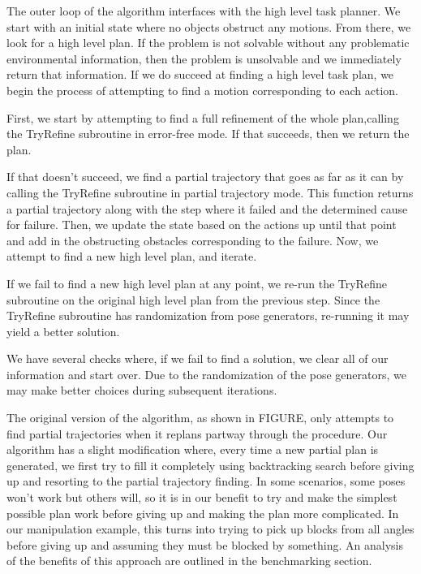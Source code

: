 \documentclass[12pt]{article}
\begin{document}
The outer loop of the algorithm interfaces with the high level task planner.  
We start with an initial state where no objects obstruct any motions.  
From there, we look for a high level plan.  
If the problem is not solvable without any problematic environmental information, then the problem is unsolvable and we immediately return that information.  
If we do succeed at finding a high level task plan, we begin the process of attempting to find a motion corresponding to each action.

First, we start by attempting to find a full refinement of the whole plan,calling the TryRefine subroutine in error-free mode.  
If that succeeds, then we return the plan.  

If that doesn't succeed, we find a partial trajectory that goes as far as it can by calling the TryRefine subroutine in partial trajectory mode.  
This function returns a partial trajectory along with the step where it failed and the determined cause for failure.  
Then, we update the state based on the actions up until that point and add in the obstructing obstacles corresponding to the failure.  
Now, we attempt to find a new high level plan, and iterate.  

If we fail to find a new high level plan at any point, we re-run the TryRefine subroutine on the original high level plan from the previous step.  
Since the TryRefine subroutine has randomization from pose generators, re-running it may yield a better solution. 

We have several checks where, if we fail to find a solution, we clear all of our information and start over.  Due to the randomization of the pose generators, we may make better choices during subsequent iterations.  

The original version of the algorithm, as shown in FIGURE, only attempts to find partial trajectories when it replans partway through the procedure.  Our algorithm has a slight modification where, every time a new partial plan is generated, we first try to fill it completely using backtracking search before giving up and resorting to the partial trajectory finding.  In some scenarios, some poses won't work but others will, so it is in our benefit to try and make the simplest possible plan work before giving up and making the plan more complicated.  In our manipulation example, this turns into trying to pick up blocks from all angles before giving up and assuming they must be blocked by something.  An analysis of the benefits of this approach are outlined in the benchmarking section.  
\end{document}
